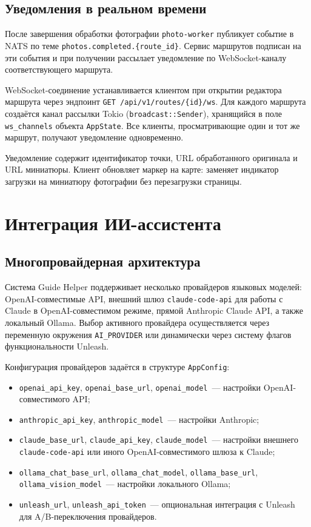 \subsection{Уведомления в реальном времени}

После завершения обработки фотографии \texttt{photo-worker} публикует событие в NATS по теме \texttt{photos.completed.\{route\_id\}}. Сервис маршрутов подписан на эти события и при получении рассылает уведомление по WebSocket-каналу соответствующего маршрута.

WebSocket-соединение устанавливается клиентом при открытии редактора маршрута через эндпоинт \texttt{GET /api/v1/routes/\{id\}/ws}. Для каждого маршрута создаётся канал рассылки Tokio (\texttt{broadcast::Sender}), хранящийся в поле \texttt{ws\_channels} объекта \texttt{AppState}. Все клиенты, просматривающие один и тот же маршрут, получают уведомление одновременно.

Уведомление содержит идентификатор точки, URL обработанного оригинала и URL миниатюры. Клиент обновляет маркер на карте: заменяет индикатор загрузки на миниатюру фотографии без перезагрузки страницы.

\section{Интеграция ИИ-ассистента}
\label{sec:ai-assistant-implementation}

\subsection{Многопровайдерная архитектура}

Система Guide Helper поддерживает несколько провайдеров языковых моделей:
OpenAI-совместимые API, внешний шлюз \texttt{claude-code-api} для работы с Claude
в OpenAI-совместимом режиме, прямой Anthropic Claude API, а также локальный
Ollama. Выбор активного провайдера осуществляется через переменную окружения
\texttt{AI\_PROVIDER} или динамически через систему флагов функциональности
Unleash.

Конфигурация провайдеров задаётся в структуре \texttt{AppConfig}:
\begin{itemize}
  \item \texttt{openai\_api\_key}, \texttt{openai\_base\_url}, \texttt{openai\_model}~--- настройки OpenAI-совместимого API;
  \item \texttt{anthropic\_api\_key}, \texttt{anthropic\_model}~--- настройки Anthropic;
  \item \texttt{claude\_base\_url}, \texttt{claude\_api\_key}, \texttt{claude\_model}~--- настройки внешнего \texttt{claude-code-api} или иного OpenAI-совместимого шлюза к Claude;
  \item \texttt{ollama\_chat\_base\_url}, \texttt{ollama\_chat\_model}, \texttt{ollama\_base\_url}, \texttt{ollama\_vision\_model}~--- настройки локального Ollama;
  \item \texttt{unleash\_url}, \texttt{unleash\_api\_token}~--- опциональная интеграция с Unleash для A/B-переключения провайдеров.
\end{itemize}


